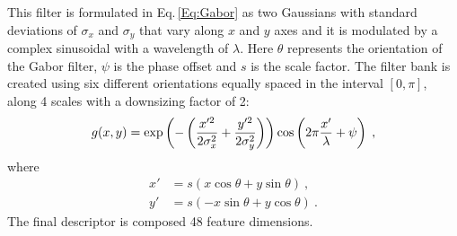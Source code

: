 \begin{description}
This filter is formulated in Eq.\,\eqref{Eq:Gabor} as two Gaussians with standard deviations of $\sigma_{x}$ and $\sigma_{y}$ that vary along $x$ and $y$ axes and it is modulated by a complex sinusoidal with a wavelength of $\lambda$. 
Here $\theta$ represents the orientation of the Gabor filter, $\psi$ is the phase offset and $s$ is the scale factor. 
The filter bank is created using six different orientations equally spaced in the interval $[0, \pi]$, along 4 scales with a downsizing factor of 2:
\begin{equation}\scriptsize
  \label{Eq:Gabor}
  g(x,y) = \exp{ \left(-\left( \frac{x'^{2}}{2\sigma_{x}^{2}}+\frac{y'^{2}}{2\sigma_{y}^{2}} \right) \right)} \cos\left( 2\pi\frac{x'}{\lambda}+\psi \right) \ , 
\end{equation}
\noindent where
\begin{align*}
  x' &= s\left( x\cos\theta+y\sin\theta\right) \ ,  \\
  y' &= s\left( -x\sin\theta +y\cos\theta\right) \ .
\end{align*}
The final descriptor is composed 48 feature dimensions.
\end{description}



